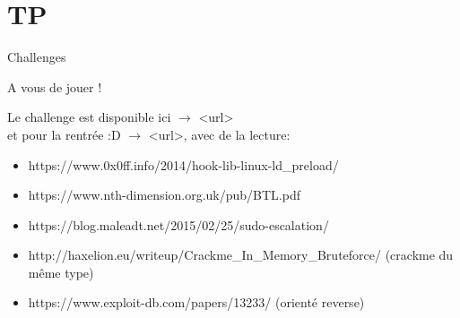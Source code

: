 \section{TP}

\frame{\tableofcontents[currentsection]}

\begin{frame}{Challenges}

\begin{block}{A vous de jouer !}

Le challenge est disponible ici $\rightarrow$ <url>
\\
et pour la rentrée :D $\rightarrow$ <url>, avec de la lecture:
\begin{itemize}
	\item https://www.0x0ff.info/2014/hook-lib-linux-ld\_preload/
	\item https://www.nth-dimension.org.uk/pub/BTL.pdf
	\item https://blog.maleadt.net/2015/02/25/sudo-escalation/
	\item http://haxelion.eu/writeup/Crackme\_In\_Memory\_Bruteforce/ (crackme du même type)
	\item https://www.exploit-db.com/papers/13233/ (orienté reverse)
\end{itemize}


\end{block}
\end{frame}
